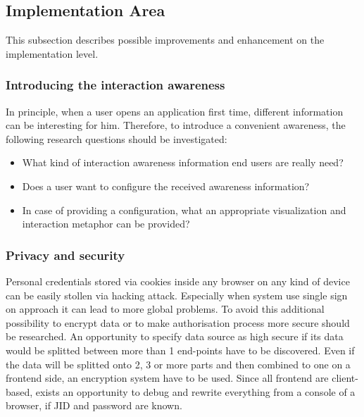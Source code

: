 	\subsection{Implementation Area}
    This subsection describes possible improvements and enhancement on the implementation level.

		\subsubsection {Introducing the interaction awareness}
		In principle, when a user opens an application first time, different information can be interesting for him. Therefore, to introduce a convenient awareness, the following research questions should be investigated:
		 \begin{itemize}
		\item What kind of interaction awareness information end users are really need?
		\item Does a user want to configure the received awareness information?
		\item In case of providing a configuration, what an appropriate visualization and interaction metaphor can be provided? 
		\end{itemize}

		\subsubsection{Privacy and security}
		Personal credentials stored via cookies inside any browser on any kind of device can be easily stollen via hacking attack. Especially when system use single sign on approach it can lead to more global problems. To avoid this additional possibility to encrypt data or to make authorisation process more secure should be researched.
        \newline
        An opportunity to specify data source as high secure if its data would be splitted between more than 1 end-points have to be discovered. Even if the data will be splitted onto 2, 3 or more parts and then combined to one on a frontend side, an encryption system have to be used. Since all frontend are client-based, exists an opportunity to debug and rewrite everything from a console of a browser, if JID and password are known.

